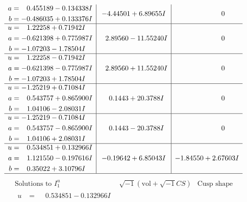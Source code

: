 \documentclass[1p]{elsarticle_modified}
\theoremstyle{definition}
\newcommand{\I}{\sqrt{-1}}
\begin{document}
$$\begin{array}{c|c|c}
\begin{aligned}
a &= \phantom{-}0.455189 - 0.134338 I \\
b &= -0.486035 + 0.133376 I\end{aligned}
 & -4.44501 + 6.89655 I & \phantom{-0.000000 } 0 \\ \hline\begin{aligned}
u &= \phantom{-}1.22258 + 0.71942 I \\
a &= -0.621398 + 0.775987 I \\
b &= -1.07203 - 1.78504 I\end{aligned}
 & \phantom{-}2.89560 - 11.55240 I & \phantom{-0.000000 } 0 \\ \hline\begin{aligned}
u &= \phantom{-}1.22258 - 0.71942 I \\
a &= -0.621398 - 0.775987 I \\
b &= -1.07203 + 1.78504 I\end{aligned}
 & \phantom{-}2.89560 + 11.55240 I & \phantom{-0.000000 } 0 \\ \hline\begin{aligned}
u &= -1.25219 + 0.71084 I \\
a &= \phantom{-}0.543757 + 0.865900 I \\
b &= \phantom{-}1.04106 - 2.08031 I\end{aligned}
 & \phantom{-}0.1443 + 20.3788 I & \phantom{-0.000000 } 0 \\ \hline\begin{aligned}
u &= -1.25219 - 0.71084 I \\
a &= \phantom{-}0.543757 - 0.865900 I \\
b &= \phantom{-}1.04106 + 2.08031 I\end{aligned}
 & \phantom{-}0.1443 - 20.3788 I & \phantom{-0.000000 } 0 \\ \hline\begin{aligned}
u &= \phantom{-}0.534851 + 0.132966 I \\
a &= \phantom{-}1.121550 - 0.197616 I \\
b &= \phantom{-}0.35022 + 3.10796 I\end{aligned}
 & -0.19642 + 6.85043 I & -1.84550 + 2.67603 I\\
 \hline 
 \end{array}$$\newpage$$\begin{array}{c|c|c}  
\text{Solutions to }I^u_{1}& \I (\text{vol} + \sqrt{-1}CS) & \text{Cusp shape}\\
 \hline 
\begin{aligned}
u &= \phantom{-}0.534851 - 0.132966 I \\

\end{aligned}
\end{array}$$
\end{document}
